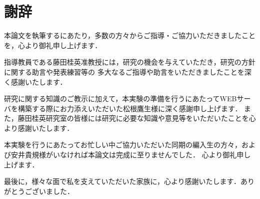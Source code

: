 \chapter*{謝辞}
本論文を執筆するにあたり，多数の方々からご指導・ご協力いただきましたことを，心より御礼申し上げます．

指導教員である藤田桂英准教授には，研究の機会を与えていただき，研究の方針に関する助言や発表練習等の
多大なるご指導や助言をいただきましたことを深く感謝いたします．

研究に関する知識のご教示に加えて，本実験の準備を行うにあたってWEBサーバを構築する際にお力添えいただいた松根鷹生様に深く感謝申し上げます．
また，藤田桂英研究室の皆様には研究に必要な知識や意見等をいただいたことを心より感謝いたします．

本実験を行うにあたってお忙しい中ご協力いただいた同期の編入生の方々，および安井貴規様がいなければ本論文は完成に至りませんでした．
心より御礼申し上げます．

最後に，様々な面で私を支えていただいた家族に，心より感謝いたします．ありがとうございました．





\begin{comment}

\renewcommand{\bibname}{付録 発表論文一覧}

\begin{thebibliography}{99}
\item S. Kakimoto and K. Fujita. 二者間複数論点交渉問題におけるパレートフロント推定手法の提案. Joint Agent Workshop and Symposium, 2014.
\item S. Kakimoto and K. Fujita. Estimating Pareto Fronts using Interdependency between Issues for Bilateral Multi-issue Closed Nonlinear Negotiations. Applications Knowledge and Service Technology for Life, Environment, and Sustainability workshop(KASTLES),2014.
\item S. Kakimoto and K. Fujita. 二者間非線形交渉問題におけるパレートフロント推定を利用した自動交渉エージェントの設計と評価. 情報処理学会 第177回 知能システム研究会, 2014.

\end{thebibliography}

\end{comment}


